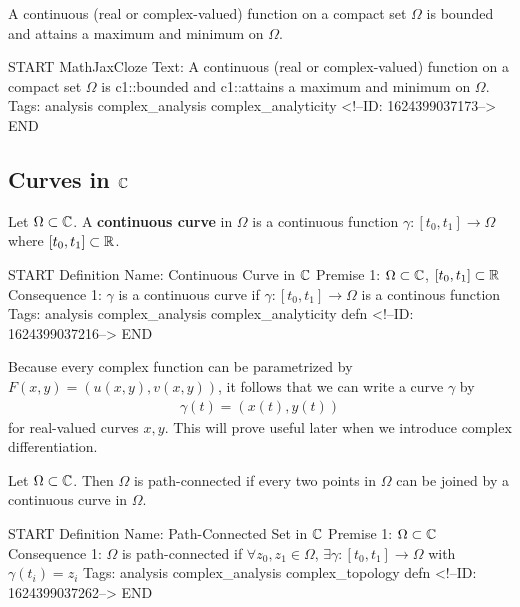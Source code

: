 \documentclass{memoir}
\begin{document}
\begin{cor}
	A continuous (real or complex-valued) function on a compact set \(\Omega\) is bounded and attains a maximum and minimum on \(\Omega\).
\end{cor}

\begin{anki}
START
MathJaxCloze
Text: A continuous (real or complex-valued) function on a compact set \(\Omega \) is {{c1::bounded}} and {{c1::attains a maximum and minimum on \(\Omega\)}}.
Tags: analysis complex_analysis complex_analyticity
<!--ID: 1624399037173-->
END
\end{anki}

\subsection{Curves in \(\mathbb{C}\)}
\label{sub:curves_in_c}

\begin{defn}
	Let \(\Omega\subset \mathbb{C}\). A \textbf{continuous curve} in \(\Omega\) is a continuous function \(\gamma :[t_0,t_1]\to \Omega\) where \([t_0,t_1]\subset \mathbb{R}\).
\end{defn}

\begin{anki}
START
Definition
Name: Continuous Curve in \(\mathbb{C}\)
Premise 1: \(\Omega\subset \mathbb{C}\), \([t_0,t_1] \subset \mathbb{R}\)
Consequence 1: \(\gamma \) is a continuous curve if \(\gamma:[t_0,t_1]\to \Omega\) is a continous function
Tags: analysis complex_analysis complex_analyticity defn
<!--ID: 1624399037216-->
END
\end{anki}

Because every complex function can be parametrized by \(F(x,y) = (u(x,y),v(x,y))\), it follows that we can write a curve \(\gamma \) by
\begin{align*}
	\gamma (t) = (x(t),y(t))
\end{align*}
for real-valued curves \(x,y\). This will prove useful later when we introduce complex differentiation.

\begin{defn}
	Let \(\Omega\subset \mathbb{C}\). Then \(\Omega\) is path-connected if every two points in  \(\Omega\) can be joined by a continuous curve in \(\Omega\).
\end{defn}

\begin{anki}
START
Definition
Name: Path-Connected Set in \(\mathbb{C}\)
Premise 1: \(\Omega\subset \mathbb{C}\)
Consequence 1: \(\Omega\) is path-connected if \(\forall z_0,z_1 \in \Omega\), \(\exists \gamma:[t_0,t_1]\to \Omega\) with \(\gamma(t_i)=z_i\)
Tags: analysis complex_analysis complex_topology defn
<!--ID: 1624399037262-->
END
\end{anki}
\end{document}
